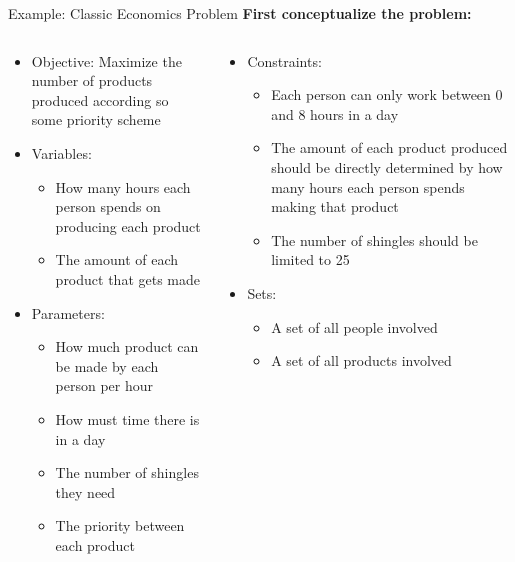 \documentclass[10pt, aspectratio=169]{beamer}
\begin{document}
\begin{frame}{Example: Classic Economics Problem}
    \textbf{First conceptualize the problem:}
    \begin{columns}[t]
        \begin{column}[t]{0.5\textwidth}
            \begin{itemize}
                \item Objective: Maximize the number of products produced according so some priority scheme
                \item Variables: 
                \begin{itemize}
                    \item How many hours each person spends on producing each product
                    \item The amount of each product that gets made
                \end{itemize}
                
                \item Parameters: 
                \begin{itemize}
                    \item How much product can be made by each person per hour
                    \item How must time there is in a day
                    \item The number of shingles they need
                    \item The priority between each product
                \end{itemize}
            \end{itemize}
        \end{column}
        \begin{column}[t]{0.5\textwidth}
            \begin{itemize}
                \item Constraints:
                \begin{itemize}
                    \item Each person can only work between 0 and 8 hours in a day
                    \item The amount of each product produced should be directly determined by how many hours each person spends making that product
                    \item The number of shingles should be limited to 25
                \end{itemize}
                \item Sets:
                \begin{itemize}
                    \item A set of all people involved
                    \item A set of all products involved
                \end{itemize}
            \end{itemize}
        \end{column}
    \end{columns}
\end{frame}
\end{document}
